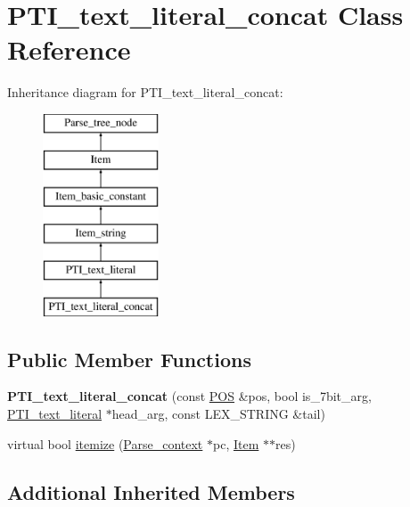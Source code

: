 \hypertarget{classPTI__text__literal__concat}{}\section{P\+T\+I\+\_\+text\+\_\+literal\+\_\+concat Class Reference}
\label{classPTI__text__literal__concat}
Inheritance diagram for P\+T\+I\+\_\+text\+\_\+literal\+\_\+concat\+:\begin{figure}[H]
\begin{center}
\leavevmode
\includegraphics[height=6.000000cm]{classPTI__text__literal__concat}
\end{center}
\end{figure}
\subsection*{Public Member Functions}
\begin{DoxyCompactItemize}
\item 
\mbox{\label{classPTI__text__literal__concat_a85a056e7971e64c5fb367d80fbd9f70b}} 
{\bfseries P\+T\+I\+\_\+text\+\_\+literal\+\_\+concat} (const \mbox{\hyperlink{structYYLTYPE}{P\+OS}} \&pos, bool is\+\_\+7bit\+\_\+arg, \mbox{\hyperlink{classPTI__text__literal}{P\+T\+I\+\_\+text\+\_\+literal}} $\ast$head\+\_\+arg, const L\+E\+X\+\_\+\+S\+T\+R\+I\+NG \&tail)
\item 
virtual bool \mbox{\hyperlink{classPTI__text__literal__concat_abd01acba243b32d4fee0cf5b5c8cb5ea}{itemize}} (\mbox{\hyperlink{structParse__context}{Parse\+\_\+context}} $\ast$pc, \mbox{\hyperlink{classItem}{Item}} $\ast$$\ast$res)
\end{DoxyCompactItemize}
\subsection*{Additional Inherited Members}


